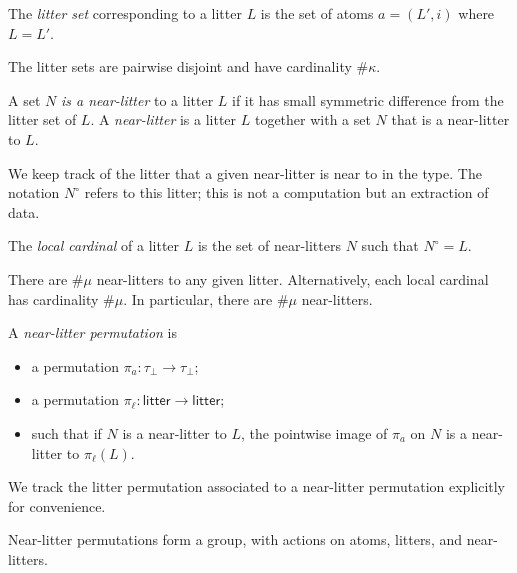 \documentclass{article}
\begin{document}
\begin{definition}
    The \emph{litter set} corresponding to a litter \( L \) is the set of atoms \( a = (L', i) \) where \( L = L' \).
\end{definition}
\begin{lemma}
    The litter sets are pairwise disjoint and have cardinality \( \#\kappa \).
\end{lemma}
\begin{definition}
    A set \( N \) \emph{is a near-litter} to a litter \( L \) if it has small symmetric difference from the litter set of \( L \).
    A \emph{near-litter} is a litter \( L \) together with a set \( N \) that is a near-litter to \( L \).
\end{definition}
\begin{remark}
    We keep track of the litter that a given near-litter is near to in the type.
    The notation \( N^\circ \) refers to this litter; this is not a computation but an extraction of data.
\end{remark}
\begin{definition}
    The \emph{local cardinal} of a litter \( L \) is the set of near-litters \( N \) such that \( N^\circ = L \).
\end{definition}
\begin{lemma}
    There are \( \#\mu \) near-litters to any given litter.
    Alternatively, each local cardinal has cardinality \( \#\mu \).
    In particular, there are \( \#\mu \) near-litters.
\end{lemma}
\begin{definition}
    A \emph{near-litter permutation} is
    \begin{itemize}
        \item a permutation \( \pi_a \colon \tau_\bot \to \tau_\bot \);
        \item a permutation \( \pi_\ell \colon \mathsf{litter} \to \mathsf{litter} \);
        \item such that if \( N \) is a near-litter to \( L \), the pointwise image of \( \pi_a \) on \( N \) is a near-litter to \( \pi_\ell(L) \).
    \end{itemize}
\end{definition}
\begin{remark}
    We track the litter permutation associated to a near-litter permutation explicitly for convenience.
\end{remark}
\begin{lemma}
    Near-litter permutations form a group, with actions on atoms, litters, and near-litters.
\end{lemma}
\end{document}
